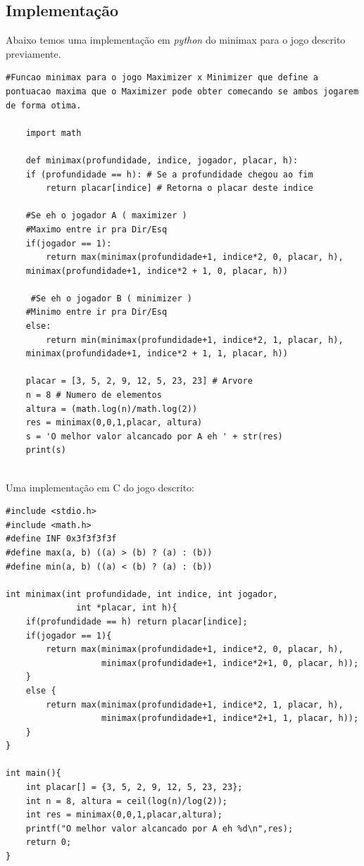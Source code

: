 \documentclass[]{article}
\begin{document}
\subsection{Implementação}
 Abaixo temos uma implementação em \emph{python} do minimax para o jogo descrito previamente.
	\begin{lstlisting}[]
	#Funcao minimax para o jogo Maximizer x Minimizer que define a pontuacao maxima que o Maximizer pode obter comecando se ambos jogarem de forma otima.
	
	import math
	
	def minimax(profundidade, indice, jogador, placar, h):
	if (profundidade == h): # Se a profundidade chegou ao fim
		return placar[indice] # Retorna o placar deste indice	
	
	#Se eh o jogador A ( maximizer )
	#Maximo entre ir pra Dir/Esq
	if(jogador == 1): 
		return max(minimax(profundidade+1, indice*2, 0, placar, h),  
	minimax(profundidade+1, indice*2 + 1, 0, placar, h)) 
	
	 #Se eh o jogador B ( minimizer ) 
	#Minimo entre ir pra Dir/Esq
	else:
		return min(minimax(profundidade+1, indice*2, 1, placar, h), 
	minimax(profundidade+1, indice*2 + 1, 1, placar, h))
	
	placar = [3, 5, 2, 9, 12, 5, 23, 23] # Arvore
	n = 8 # Numero de elementos
	altura = (math.log(n)/math.log(2))
	res = minimax(0,0,1,placar, altura)
	s = 'O melhor valor alcancado por A eh ' + str(res)
	print(s)
	
	\end{lstlisting}
	
Uma implementação em C do jogo descrito:

\begin{lstlisting}[]
#include <stdio.h>
#include <math.h>
#define INF 0x3f3f3f3f
#define max(a, b) ((a) > (b) ? (a) : (b))
#define min(a, b) ((a) < (b) ? (a) : (b))

int minimax(int profundidade, int indice, int jogador,
	          int *placar, int h){
	if(profundidade == h) return placar[indice];
	if(jogador == 1){
		return max(minimax(profundidade+1, indice*2, 0, placar, h), 
				   minimax(profundidade+1, indice*2+1, 0, placar, h));
	}
	else {
		return max(minimax(profundidade+1, indice*2, 1, placar, h),
				   minimax(profundidade+1, indice*2+1, 1, placar, h));
	}
}

int main(){
	int placar[] = {3, 5, 2, 9, 12, 5, 23, 23};
	int n = 8, altura = ceil(log(n)/log(2));
	int res = minimax(0,0,1,placar,altura);
	printf("O melhor valor alcancado por A eh %d\n",res);
	return 0;
}
\end{lstlisting}
	
\end{document}
